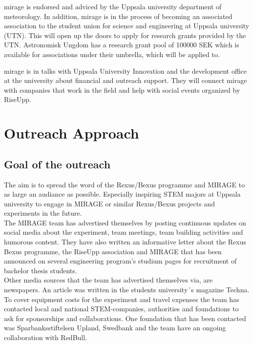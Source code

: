\gls{mirage} is endorsed and adviced by the Uppsala university department of meteorology. In addition, \gls{mirage} is in the process of becoming an associated association to the student union for science and engineering at Uppsala university (UTN). This will open up the doors to apply for research grants provided by the UTN. Astronomisk Ungdom has a research grant pool of 100000 SEK which is available for associations under their umbrella, which will be applied to.

\gls{mirage} is in talks with Uppsala University Innovation and the development office at the university about financial and outreach support. They will connect \gls{mirage} with companies that work in the field and help with social events organized by RiseUpp.


\section{Outreach Approach}
\subsection{Goal of the outreach}
The aim is to spread the word of the Rexus/Bexus programme and MIRAGE to as large an audiance as possible. Especially inspiring STEM majors at Uppsala university to engage in MIRAGE or similar Rexus/Bexus projects and experiments in the future.
\vspace{3mm}\\
The MIRAGE team has advertised themselves by posting continuous updates on social media about the experiment, team meetings, team building activities and humorous content. They have also written an informative letter about the Rexus Bexus programme, the RiseUpp association and MIRAGE that has been announced on several engineering program's studium pages for recruitment of bachelor thesis students.
\vspace{3mm}\\
Other media sources that the team has advertised themselves via, are newspapers. An article was written in the students university´s magazine Techna.
\vspace{3mm}\\
To cover equipment costs for the experiment and travel expenses the team has contacted local and national STEM-companies, authorities and foundations to ask for sponsorships and collaborations. One foundation that has been contacted was Sparbanksstiftelsen Upland, Swedbank and the team have an ongoing collaboration with RedBull.


